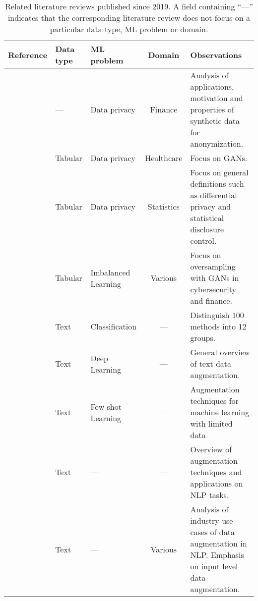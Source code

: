 \begingroup\small
\setlength\LTleft{-1.5cm}
\setlength\LTright{1.5cm}
\begin{table}[t!]
    \centering
    \caption[Related literature reviews published since 2019.]{\label{tab:literature-reviews}
        Related literature reviews published since 2019. A field containing
        ``---'' indicates that the corresponding literature review does not
        focus on a particular data type, ML problem or domain.
    }
    \begin{tabularx}{\textwidth}{@{}m{.15\linewidth}lm{.15\linewidth}cX@{}}
        \toprule
        Reference & Data type & ML problem & Domain & Observations \\
        \midrule

        \cite{assefa2020generating} & --- & Data privacy &
        Finance & Analysis of applications, motivation and properties of
        synthetic data for anonymization. \\

        \cite{hernandez2022synthetic} & Tabular & Data privacy &
        Healthcare & Focus on GANs. \\

        \cite{raghunathan2021synthetic} & Tabular & Data privacy &
        Statistics & Focus on general definitions such as differential privacy
        and statistical disclosure control.\\

        \cite{sauber2022use} & Tabular & Imbalanced Learning &
        Various & Focus on oversampling with GANs in cybersecurity
        and finance.\\

        \cite{bayer2021survey} & Text & Classification & --- & Distinguish
        100 methods into 12 groups. \\

        \cite{shorten2021text} & Text & Deep Learning & --- & General
        overview of text data augmentation. \\

        \cite{chen2021empirical} & Text & Few-shot Learning & --- &
        Augmentation techniques for machine learning with limited data\\

        \cite{feng2021survey} & Text & --- & --- & Overview of augmentation
        techniques and applications on NLP tasks.\\

        \cite{liu2020survey} & Text & --- & Various & Analysis of industry
        use cases of data augmentation in NLP\@. Emphasis on input level data
        augmentation.\\


\end{tabularx}
\end{table}
